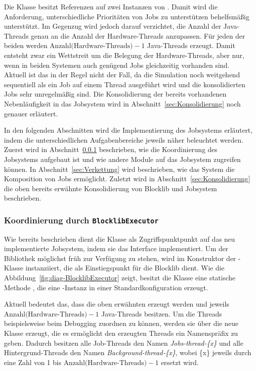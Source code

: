 Die Klasse  besitzt Referenzen auf zwei Instanzen von . Damit wird die Anforderung, unterschiedliche Prioritäten von Jobs zu unterstützen behelfsmäßig unterstützt. Im Gegenzug wird jedoch darauf verzichtet, die Anzahl der Java-Threads genau an die Anzahl der Hardware-Threads anzupassen. Für jeden der beiden  werden $\text{Anzahl(Hardware-Threads)} - 1$ Java-Threads erzeugt. Damit entsteht zwar ein Wettstreit um die Belegung der Hardware-Threads, aber nur, wenn in beiden Systemen auch genügend Jobs gleichzeitig vorhanden sind. Aktuell ist das in der Regel nicht der Fall, da die Simulation noch weitgehend sequentiell als ein Job auf einem Thread ausgeführt wird und die konsolidierten Jobs sehr unregelmäßig sind. Die Konsolidierung der bereits vorhandenen Nebenläufigkeit in das Jobsystem wird in Abschnitt~\ref{sec:Konsolidierung} noch genauer erläutert. 

In den folgenden Abschnitten wird die Implementierung des Jobsystems erläutert, indem die unterschiedlichen Aufgabenbereiche jeweils näher beleuchtet werden. Zuerst wird in Abschnitt~\ref{sec:Koordinierung} beschrieben, wie die Koordinierung des Jobsystems aufgebaut ist und wie andere Module auf das Jobsystem zugreifen können. In Abschnitt~\ref{sec:Verkettung} wird beschrieben, wie das System die Komposition von Jobs ermöglicht. Zuletzt wird in Abschnitt~\ref{sec:Konsolidierung} die oben bereits erwähnte Konsolidierung von Blocklib und Jobsystem beschrieben.

\subsubsection{Koordinierung durch \texttt{BlocklibExecutor}}\label{sec:Koordinierung}

Wie bereits beschrieben dient die Klasse  als Zugriffspunktpunkt auf das neu implementierte Jobsystem, indem sie das Interface  implementiert. Um der Bibliothek möglichst früh zur Verfügung zu stehen, wird  im Konstruktor der -Klasse instanziiert, die als Einstiegspunkt für die Blocklib dient. Wie die Abbildung~\ref{fig:diag-BlocklibExecutor} zeigt, besitzt die Klasse  eine statische Methode , die eine -Instanz in einer Standardkonfiguration erzeugt.

Aktuell bedeutet das, dass die oben erwähnten  erzeugt werden und jeweils $\text{Anzahl(Hardware-Threads)} - 1$ Java-Threads besitzen. Um die Threads beispielsweise beim Debugging zuordnen zu können, werden sie über die neue Klasse  erzeugt, die es ermöglicht den erzeugten Threads ein Namenspräfix zu geben. Dadurch besitzen alle Job-Threads den Namen \emph{Jobs-thread-\{x\}} und alle Hintergrund-Threads den Namen \emph{Background-thread-\{x\}}, wobei \{x\} jeweils durch eine Zahl von 1 bis $\text{Anzahl(Hardware-Threads)} - 1$ ersetzt wird.

